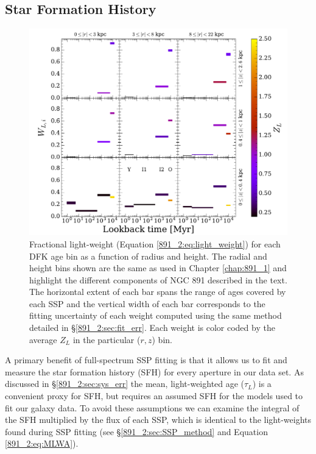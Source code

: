 \subsection{Star Formation History}
\label{891_2:sec:SFH}
\begin{figure}
  \centering
  \includegraphics[width=\textwidth]{891_2/figs/SFH_cuts.pdf}
  \caption[SSP light weights in ($r,|z|$)
  grid]{\fixspacing\label{891_2:fig:SFH_cuts}Fractional light-weight
    (Equation \ref{891_2:eq:light_weight}) for each DFK age bin as a
    function of radius and height. The radial and height bins shown
    are the same as used in Chapter \ref{chap:891_1} and highlight the
    different components of NGC 891 described in the text. The
    horizontal extent of each bar spans the range of ages covered by
    each SSP and the vertical width of each bar corresponds to the
    fitting uncertainty of each weight computed using the same method
    detailed in \S\ref{891_2:sec:fit_err}. Each weight is color coded
    by the average $Z_L$ in the particular ($r,z$) bin.  }

\end{figure}

A primary benefit of full-spectrum SSP fitting is that it allows us to
fit and measure the star formation history (SFH) for every aperture in
our data set. As discussed in \S\ref{891_2:sec:sys_err} the mean,
light-weighted age ($\tau_L$) is a convenient proxy for SFH, but
requires an assumed SFH for the models used to fit our galaxy data. To
avoid these assumptions we can examine the integral of the SFH
multiplied by the flux of each SSP, which is identical to the
light-weights found during SSP fitting (see
\S\ref{891_2:sec:SSP_method} and Equation \ref{891_2:eq:MLWA}).

